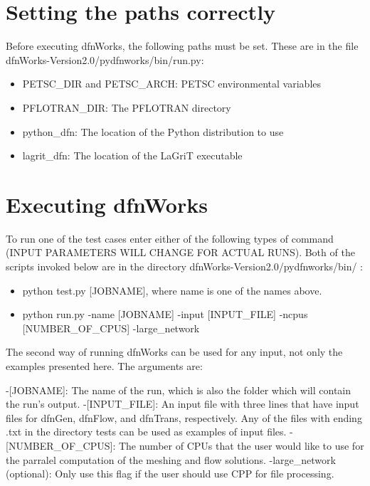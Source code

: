 \documentclass[letterpaper,10pt,english]{sphinxmanual}
\begin{document}
\section{Setting the paths correctly}
\label{examples:setting-the-paths-correctly}
Before executing dfnWorks, the following paths must be set. These are in the file dfnWorks-Version2.0/pydfnworks/bin/run.py:
\begin{itemize}
\item {} 
PETSC\_DIR and PETSC\_ARCH: PETSC environmental variables

\item {} 
PFLOTRAN\_DIR: The PFLOTRAN directory

\item {} 
python\_dfn: The location of the Python distribution to use

\item {} 
lagrit\_dfn: The location of the LaGriT executable

\end{itemize}


\section{Executing dfnWorks}
\label{examples:executing-dfnworks}
To run one of the test cases enter either of the following types of command (INPUT PARAMETERS WILL CHANGE FOR ACTUAL RUNS). Both of the scripts invoked below are in the directory dfnWorks-Version2.0/pydfnworks/bin/ :
\begin{itemize}
\item {} 
python test.py {[}JOBNAME{]}, where name is one of the names above.

\item {} 
python run.py -name {[}JOBNAME{]} -input {[}INPUT\_FILE{]} -ncpus {[}NUMBER\_OF\_CPUS{]} -large\_network

\end{itemize}

The second way of running dfnWorks can be used for any input, not only the examples presented here. The arguments are:

-{[}JOBNAME{]}: The name of the run, which is also the folder which will contain the run's output.
-{[}INPUT\_FILE{]}: An input file with three lines that have input files for dfnGen, dfnFlow, and dfnTrans, respectively. Any of the files with ending .txt in the directory tests can be used as examples of input files.
-{[}NUMBER\_OF\_CPUS{]}: The number of CPUs that the user would like to use for the parralel computation of the meshing and flow solutions.
-large\_network (optional): Only use this flag if the user should use CPP for file processing.
\end{document}
